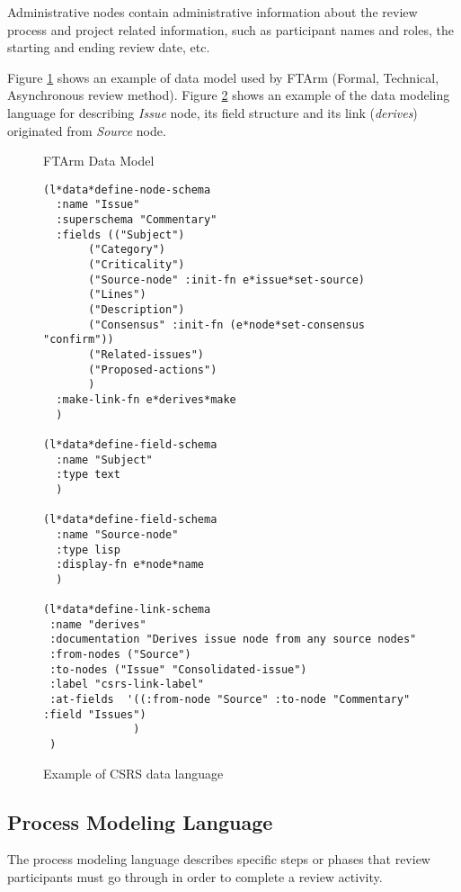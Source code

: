 Administrative nodes contain administrative information about the
review process and project related information, such as participant names
and roles, the starting and ending review date, etc.

Figure \ref{fig:async-data-model} shows an example of data model used
by FTArm (Formal, Technical, Asynchronous review
method)\cite{Johnson93,CSDL-93-17}. Figure \ref{fig:data-language}
shows an example of the data modeling language for describing
{\sl Issue} node, its field structure and its link ({\sl derives})
originated from {\sl Source} node.

\begin{figure}[htb]
  {\centerline{}}
  \caption{FTArm Data Model}
  \label{fig:async-data-model}
\end{figure}

\begin{figure}[tp]
  \footnotesize
  \begin{verbatim}
(l*data*define-node-schema
  :name "Issue"
  :superschema "Commentary"
  :fields (("Subject")
	   ("Category")
	   ("Criticality")
	   ("Source-node" :init-fn e*issue*set-source)
	   ("Lines")
	   ("Description")
	   ("Consensus" :init-fn (e*node*set-consensus "confirm"))
	   ("Related-issues")
	   ("Proposed-actions")
	   )
  :make-link-fn e*derives*make
  )

(l*data*define-field-schema
  :name "Subject"
  :type text
  )

(l*data*define-field-schema
  :name "Source-node"
  :type lisp
  :display-fn e*node*name
  )

(l*data*define-link-schema
 :name "derives"
 :documentation "Derives issue node from any source nodes"
 :from-nodes ("Source")
 :to-nodes ("Issue" "Consolidated-issue")
 :label "csrs-link-label"
 :at-fields  '((:from-node "Source" :to-node "Commentary" :field "Issues")
              )
 )

  \end{verbatim}
  \normalsize
  \caption{Example of CSRS data language}
  \label{fig:data-language}
\end{figure}



\subsection{Process Modeling Language}

The process modeling language describes specific steps or phases that
review participants must go through in order to complete a review activity.

